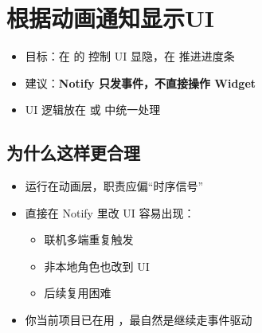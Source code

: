 \section{根据动画通知显示UI}

\begin{itemize}
	\item 目标：在  的  控制 UI 显隐，在  推进进度条
	\item 建议：\textbf{Notify 只发事件，不直接操作 Widget}
	\item UI 逻辑放在  或  中统一处理
\end{itemize}

\subsection{为什么这样更合理}

\begin{itemize}
	\item {} 运行在动画层，职责应偏“时序信号”
	\item 直接在 Notify 里改 UI 容易出现：
	\begin{itemize}
		\item 联机多端重复触发
		\item 非本地角色也改到 UI
		\item 后续复用困难
	\end{itemize}
	\item 你当前项目已在用 ，最自然是继续走事件驱动
\end{itemize}

